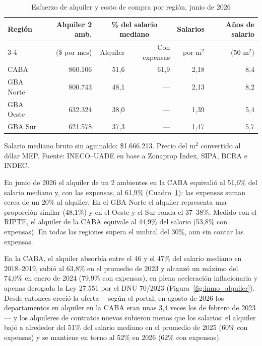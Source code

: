 \begin{table}[!htb]
\centering
\small
\caption{Esfuerzo de alquiler y costo de compra por región, junio de 2026}
\vspace{.25 cm}
\label{tab:inmo_regiones}
\begin{tabular}{@{}l r r r r r@{}}
\toprule
Región & Alquiler 2 amb. & \multicolumn{2}{c}{\% del salario mediano} & Salarios & Años de salario \\
\cmidrule(lr){3-4}
 & (\$ por mes) & Alquiler & Con expensas & por m$^2$ & (50 m$^2$) \\
\midrule
CABA      & 860.106 & 51,6 & 61,9 & 2,18 & 8,4 \\
GBA Norte & 800.743 & 48,1 & ---  & 2,13 & 8,2 \\
GBA Oeste & 632.324 & 38,0 & ---  & 1,39 & 5,4 \\
GBA Sur   & 621.578 & 37,3 & ---  & 1,47 & 5,7 \\
\bottomrule
\end{tabular}

\smallskip
\parbox{13.5cm}{\footnotesize Salario mediano bruto sin aguinaldo: \$1.666.213. Precio del m$^2$ convertido al dólar MEP. Fuente: INECO--UADE en base a Zonaprop Index, SIPA, BCRA e INDEC.}
\end{table}

En junio de 2026 el alquiler de un 2 ambientes en la CABA equivalió al 51,6\% del salario mediano y, con las expensas, al 61,9\% (Cuadro~\ref{tab:inmo_regiones}): las expensas suman cerca de un 20\% al alquiler. En el GBA Norte el alquiler representa una proporción similar (48,1\%) y en el Oeste y el Sur ronda el 37--38\%. Medido con el RIPTE, el alquiler de la CABA equivale al 44,9\% del salario (53,8\% con expensas). En todas las regiones supera el umbral del 30\%, aun sin contar las expensas.

En la CABA, el alquiler absorbía entre el 46 y el 47\% del salario mediano en 2018--2019, subió al 63,8\% en el promedio de 2023 y alcanzó un máximo del 74,0\% en enero de 2024 (79,9\% con expensas), en plena aceleración inflacionaria y apenas derogada la Ley 27.551 por el DNU 70/2023 (Figura~\ref{fig:inmo_alquiler}). Desde entonces creció la oferta ---según el portal, en agosto de 2026 los departamentos en alquiler en la CABA eran unas 3,4 veces los de febrero de 2023--- y los alquileres de contratos nuevos subieron menos que los salarios: el alquiler bajó a alrededor del 51\% del salario mediano en el promedio de 2025 (60\% con expensas) y se mantiene en torno al 52\% en 2026 (62\% con expensas).

